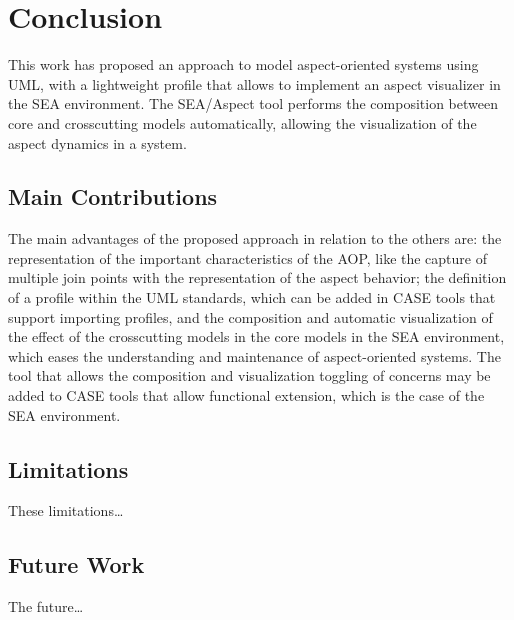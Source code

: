 \chapter{Conclusion}

This work has proposed an approach to model aspect-oriented systems using UML, with a lightweight profile that allows to implement an aspect
visualizer in the SEA environment. The SEA/Aspect tool performs the composition between core and crosscutting models automatically, allowing the visualization of
the aspect dynamics in a system.

\section{Main Contributions}

The main advantages of the proposed approach in relation to the others are: the representation of the important characteristics of the AOP, like the
capture of multiple join points with the representation of the aspect behavior; the definition of a profile within the UML standards, which can be
added in CASE tools that support importing profiles, and the composition and automatic visualization of the effect of the crosscutting models in the
core models in the SEA environment, which eases the understanding and maintenance of aspect-oriented systems. The tool that allows the composition and
visualization toggling of concerns may be added to CASE tools that allow functional extension, which is the case of the SEA environment.

\section{Limitations}

These limitations\ldots

\section{Future Work}

The future\ldots